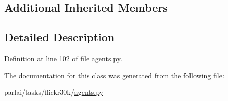 \subsection*{Additional Inherited Members}


\subsection{Detailed Description}


Definition at line 102 of file agents.\+py.



The documentation for this class was generated from the following file\+:\begin{DoxyCompactItemize}
\item 
parlai/tasks/flickr30k/\hyperlink{parlai_2tasks_2flickr30k_2agents_8py}{agents.\+py}\end{DoxyCompactItemize}
